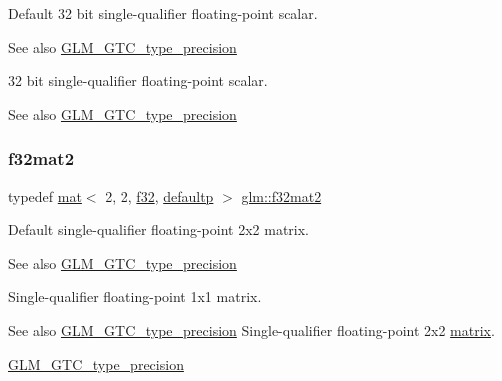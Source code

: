 Default 32 bit single-\/qualifier floating-\/point scalar. \begin{DoxySeeAlso}{See also}
\hyperlink{group__gtc__type__precision}{G\+L\+M\+\_\+\+G\+T\+C\+\_\+type\+\_\+precision}
\end{DoxySeeAlso}
32 bit single-\/qualifier floating-\/point scalar. \begin{DoxySeeAlso}{See also}
\hyperlink{group__gtc__type__precision}{G\+L\+M\+\_\+\+G\+T\+C\+\_\+type\+\_\+precision} 
\end{DoxySeeAlso}
\mbox{\label{group__gtc__type__precision_gace6703eef94c05b9985f85759fb113fa}} 
\subsubsection{\texorpdfstring{f32mat2}{f32mat2}}
{\footnotesize\ttfamily typedef \hyperlink{structglm_1_1mat}{mat}$<$ 2, 2, \hyperlink{group__gtc__type__precision_ga0ec999b57f5330d9021256e96038df04}{f32}, \hyperlink{namespaceglm_a36ed105b07c7746804d7fdc7cc90ff25a9d21ccd8b5a009ec7eb7677befc3bf51}{defaultp} $>$ \hyperlink{group__gtc__type__precision_gace6703eef94c05b9985f85759fb113fa}{glm\+::f32mat2}}

Default single-\/qualifier floating-\/point 2x2 matrix. \begin{DoxySeeAlso}{See also}
\hyperlink{group__gtc__type__precision}{G\+L\+M\+\_\+\+G\+T\+C\+\_\+type\+\_\+precision}
\end{DoxySeeAlso}
Single-\/qualifier floating-\/point 1x1 matrix. \begin{DoxySeeAlso}{See also}
\hyperlink{group__gtc__type__precision}{G\+L\+M\+\_\+\+G\+T\+C\+\_\+type\+\_\+precision} Single-\/qualifier floating-\/point 2x2 \hyperlink{_s_d_l__opengl__glext_8h_a7b24a3f2f56eb1244ae69dacb4fecb6f}{matrix}. 

\hyperlink{group__gtc__type__precision}{G\+L\+M\+\_\+\+G\+T\+C\+\_\+type\+\_\+precision} 
\end{DoxySeeAlso}
\mbox{\label{group__gtc__type__precision_ga3c0ffd3a47ae47ff05d5ea6e90825caa}} 
